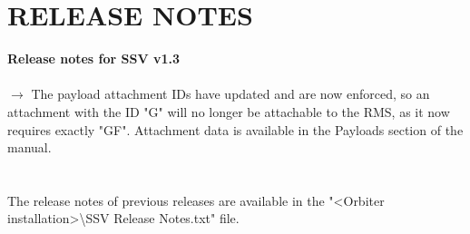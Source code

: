 \documentclass[Space_Shuttle_Vessel_Manual.tex]{subfiles}
\begin{document}
\section{RELEASE NOTES}
\label{sec:release-notes}
\noindent
\textbf{Release notes for SSV v1.3}\\\\
$\rightarrow$ The payload attachment IDs have updated and are now enforced, so an attachment with the ID "G" will no longer be attachable to the RMS, as it now requires exactly "GF". Attachment data is available in the Payloads section of the manual.\\
\\
\\
The release notes of previous releases are available in the "<Orbiter installation>\textbackslash SSV Release Notes.txt" file.
\end{document}

